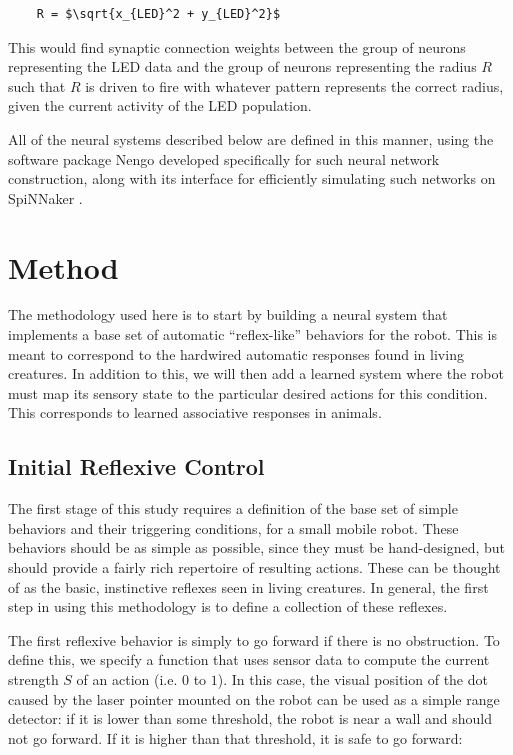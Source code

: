 \documentclass{frontiersSCNS}
\begin{document}
\begin{lstlisting}
    R = $\sqrt{x_{LED}^2 + y_{LED}^2}$
\end{lstlisting}

This would find synaptic connection weights between the group of neurons 
representing the LED data and the group of neurons representing the 
radius $R$ such that $R$ is driven to fire with whatever pattern represents 
the correct radius, given the current activity of the LED population. 

All of the neural systems described below are defined in this manner, using
the software package Nengo \citep{bekolay_nengo2014} developed specifically
for such neural network construction, along with its interface
for efficiently simulating such networks on SpiNNaker \citep{mundy2015}.

\section{Method}

The methodology used here is to start by building a neural system that
implements a base set of automatic ``reflex-like'' behaviors for the robot.
This is meant to correspond to the hardwired automatic responses found in
living creatures.  In addition to this, we will then add a learned system
where the robot must map its sensory state to the particular desired actions
for this condition.  This corresponds to learned associative responses
in animals.

\subsection{Initial Reflexive Control}
The first stage of this study requires a definition of the base set of simple 
behaviors and their triggering conditions, for a small mobile robot. These 
behaviors should be as simple as possible, since they must be hand-designed, 
but should provide a fairly rich repertoire of resulting actions. These can be 
thought of as the basic, instinctive reflexes seen in living creatures. In
general, the first step in using this methodology is to define a collection
of these reflexes.

The first reflexive behavior is simply to go forward if there is no 
obstruction. To define this, we specify a function that uses sensor data to 
compute the current strength $S$ of an action (i.e. $0$ to $1$). In this 
case, the visual position of the dot caused by the laser pointer mounted on
the robot can be used as a simple range 
detector: if it is lower than some threshold, the robot is near a wall and 
should not go forward. If it is higher than that threshold, it is safe to 
go forward: 
\end{document}
